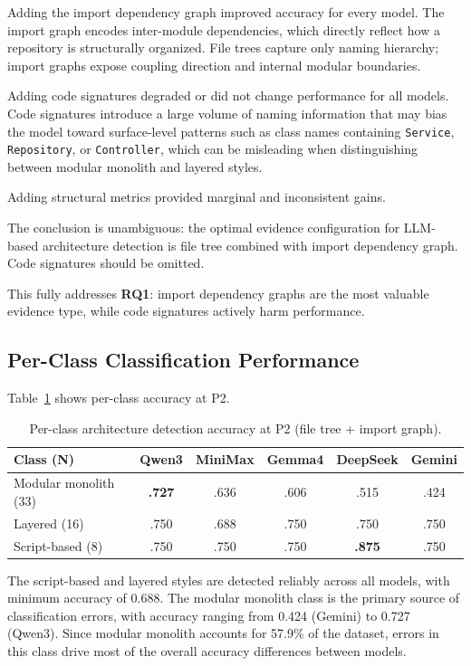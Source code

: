 Adding the import dependency graph improved accuracy for every model. The import graph encodes inter-module dependencies, which directly reflect how a repository is structurally organized. File trees capture only naming hierarchy; import graphs expose coupling direction and internal modular boundaries.

Adding code signatures degraded or did not change performance for all models. Code signatures introduce a large volume of naming information that may bias the model toward surface-level patterns such as class names containing \texttt{Service}, \texttt{Repository}, or \texttt{Controller}, which can be misleading when distinguishing between modular monolith and layered styles.

Adding structural metrics provided marginal and inconsistent gains.

The conclusion is unambiguous: the optimal evidence configuration for LLM-based architecture detection is file tree combined with import dependency graph. Code signatures should be omitted.

This fully addresses \textbf{RQ1}: import dependency graphs are the most valuable evidence type, while code signatures actively harm performance.

\subsection{Per-Class Classification Performance}
\label{subsec:eval_per_class}

Table~\ref{tab:eval_per_class} shows per-class accuracy at P2.

\begin{table}[H]
\centering
\small
\caption{Per-class architecture detection accuracy at P2 (file tree + import graph).}
\label{tab:eval_per_class}
\begin{tabular}{lccccc}
\toprule
\textbf{Class (N)} & \textbf{Qwen3} & \textbf{MiniMax} & \textbf{Gemma4} & \textbf{DeepSeek} & \textbf{Gemini} \\
\midrule
Modular monolith (33) & \textbf{.727} & .636 & .606 & .515 & .424 \\
Layered (16)          & .750 & .688 & .750 & .750 & .750 \\
Script-based (8)      & .750 & .750 & .750 & \textbf{.875} & .750 \\
\bottomrule
\end{tabular}
\end{table}

The script-based and layered styles are detected reliably across all models, with minimum accuracy of 0.688. The modular monolith class is the primary source of classification errors, with accuracy ranging from 0.424 (Gemini) to 0.727 (Qwen3). Since modular monolith accounts for 57.9\% of the dataset, errors in this class drive most of the overall accuracy differences between models.


